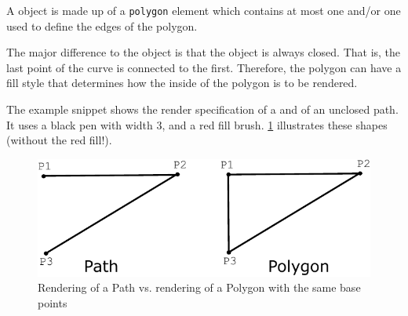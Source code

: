 A \Polygon object is made up of a \texttt{polygon} element which contains at most one 
\ListOfElements and/or one  used to define the edges of the polygon.

The major difference to the \RenderCurve 
object is that the object is always closed. 
That is, the last point of the curve is connected to the first.
Therefore, the polygon can have a fill style 
that determines how the inside of the polygon is to be rendered.

The example snippet shows the render specification of a \Polygon and of an unclosed path. It uses a 
black pen with width 3, and a red fill brush. \ref{PathVsPolygon} illustrates these shapes (without the red fill!).

{\footnotesize
{}
}

\begin{figure}[!ht]
\begin{center}
\includegraphics{figures/PathVsPolygon.pdf}
\end{center}
\caption{Rendering of a Path vs. rendering of a Polygon with the same base points}
\label{PathVsPolygon}
\end{figure}



